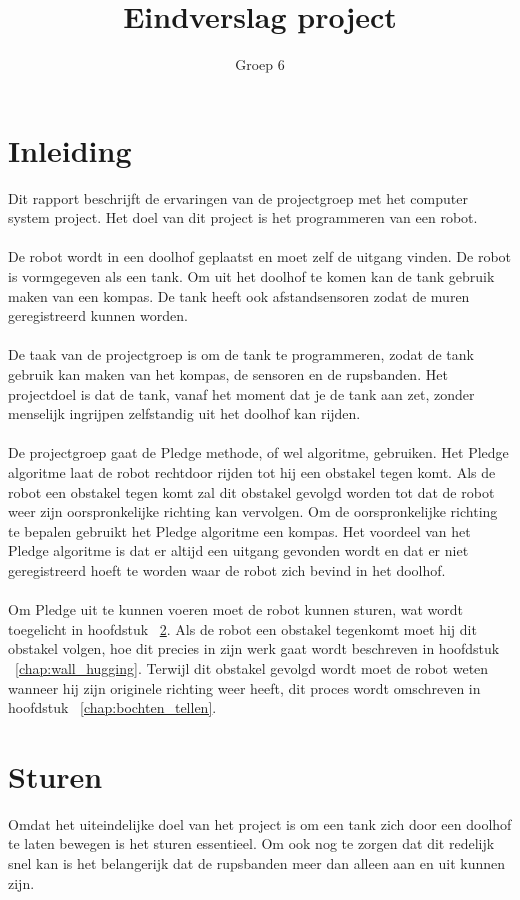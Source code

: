 \documentclass{report}
\author{Groep 6}
\title{Eindverslag project}
\begin{document}
\maketitle
\newpage
\tableofcontents
\chapter{Inleiding}
\label{chap:inleiding}
Dit rapport beschrijft de ervaringen van de projectgroep met het computer system project. Het doel van dit project is het programmeren van een robot.\\\\
De robot wordt in een doolhof geplaatst en moet zelf de uitgang vinden. De robot is vormgegeven als een tank. Om uit het doolhof te komen kan de tank gebruik maken van een kompas. De tank heeft ook afstandsensoren zodat de muren geregistreerd kunnen worden.\\\\
De taak van de projectgroep is om de tank te programmeren, zodat de tank gebruik kan maken van het kompas, de sensoren en de rupsbanden. Het projectdoel is dat de tank, vanaf het moment dat je de tank aan zet, zonder menselijk ingrijpen zelfstandig uit het doolhof kan rijden.\\\\
De projectgroep gaat de Pledge methode, of wel algoritme, gebruiken. Het Pledge algoritme laat de robot rechtdoor rijden tot hij een obstakel tegen komt. Als de robot een obstakel tegen komt zal dit obstakel gevolgd worden tot dat de robot weer zijn oorspronkelijke richting kan vervolgen. Om de oorspronkelijke richting te bepalen gebruikt het Pledge algoritme een kompas. Het voordeel van het Pledge algoritme is dat er altijd een uitgang gevonden wordt en dat er niet geregistreerd hoeft te worden waar de robot zich bevind in het doolhof.\\\\
Om Pledge uit te kunnen voeren moet de robot kunnen sturen, wat wordt toegelicht in hoofdstuk ~\ref{chap:sturen}. Als de robot een obstakel tegenkomt moet hij dit obstakel volgen, hoe dit precies in zijn werk gaat wordt beschreven in hoofdstuk ~\ref{chap:wall_hugging}. Terwijl dit obstakel gevolgd wordt moet de robot weten wanneer hij zijn originele richting weer heeft, dit proces wordt omschreven in hoofdstuk ~\ref{chap:bochten_tellen}.

\chapter{Sturen}
\label{chap:sturen}
Omdat het uiteindelijke doel van het project is om een tank zich door een doolhof te laten bewegen is het sturen essentieel. Om ook nog te zorgen dat dit redelijk snel kan is het belangerijk dat de rupsbanden meer dan alleen aan en uit kunnen zijn.
\end{document}
